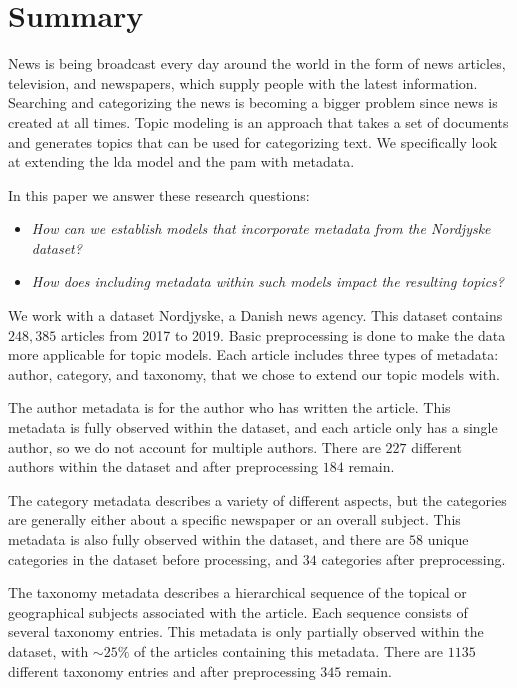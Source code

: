 \section*{Summary}
News is being broadcast every day around the world in the form of news articles, television, and newspapers, which supply people with the latest information.
Searching and categorizing the news is becoming a bigger problem since news is created at all times.
Topic modeling is an approach that takes a set of documents and generates topics that can be used for categorizing text.
We specifically look at extending the \gls{lda} model and the \gls{pam} with metadata.

In this paper we answer these research questions:
\begin{itemize}
	\item \textit{How can we establish models that incorporate metadata from the Nordjyske dataset?}
	\item \textit{How does including metadata within such models impact the resulting topics?}
\end{itemize}

We work with a dataset Nordjyske, a Danish news agency.
This dataset contains $248,385$ articles from 2017 to 2019.
Basic preprocessing is done to make the data more applicable for topic models.
Each article includes three types of metadata: author, category, and taxonomy, that we chose to extend our topic models with.

The author metadata is for the author who has written the article.
This metadata is fully observed within the dataset, and each article only has a single author, so we do not account for multiple authors.
There are $227$ different authors within the dataset and after preprocessing $184$ remain.

The category metadata describes a variety of different aspects, but the categories are generally either about a specific newspaper or an overall subject.
This metadata is also fully observed within the dataset, and there are $58$ unique categories in the dataset before processing, and $34$ categories after preprocessing.

The taxonomy metadata describes a hierarchical sequence of the topical or geographical subjects associated with the article.
Each sequence consists of several taxonomy entries.
This metadata is only partially observed within the dataset, with ${\sim}25\%$ of the articles containing this metadata.
There are $1135$ different taxonomy entries and after preprocessing $345$ remain.

